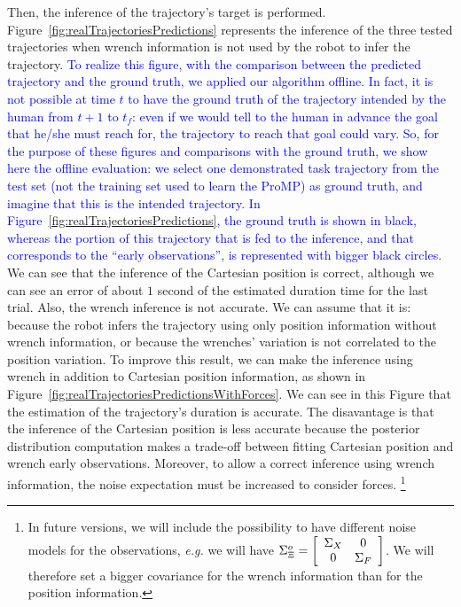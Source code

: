 \documentclass[utf8]{frontiersSCNS} %
\newcommand{\rev}[1]{\textcolor{blue}{#1}}
\begin{document}
Then, the inference of the trajectory's target is performed. 
Figure~\ref{fig:realTrajectoriesPredictions} represents the inference of the three tested trajectories when wrench information is not used by the robot to infer the trajectory. 
\rev{To realize this figure, with the comparison between the predicted trajectory and the ground truth, we applied our algorithm offline. In fact, it is not possible at time $t$ to have the ground truth of the trajectory intended by the human from $t+1$ to $t_f$: even if we would tell to the human in advance the goal that he/she must reach for, the trajectory to reach that goal could vary. So, for the purpose of these figures and comparisons with the ground truth, we show here the offline evaluation: we select one demonstrated task trajectory from the test set (not the training set used to learn the ProMP) as ground truth, and imagine that this is the intended trajectory.
In Figure~\ref{fig:realTrajectoriesPredictions}, the ground truth is shown in black, whereas the portion of this trajectory that is fed to the inference, and that corresponds to the ``early observations'', is represented with bigger black circles.
}
We can see that the inference of the Cartesian position is correct, although we can see an error of about $1$ second of the estimated duration time for the last trial. Also, the wrench inference is not accurate. We can assume that it is: because the robot infers the trajectory using only position information without wrench information, or because the wrenches' variation is not correlated to the position variation.
To improve this result, we can make the inference using wrench in addition to Cartesian position information, as shown in Figure~\ref{fig:realTrajectoriesPredictionsWithForces}. We can see in this Figure that the estimation of the trajectory's duration is accurate. The disavantage is that the inference of the Cartesian position is less accurate because the posterior distribution computation makes a trade-off between fitting Cartesian position and wrench early observations. Moreover, to allow a correct inference using wrench information, the noise expectation must be increased to consider forces. \footnote{In future versions, we will include the possibility to have different noise models for the observations, \textit{e.g.} we will have $\Sigma_\Xi^o = \left[
\begin{array}{c c}
\Sigma_X  & 0\\  
0 &\Sigma_F \\
\end{array}\right]$. We will therefore set a bigger covariance for the wrench information than for the position information.}
\end{document}
